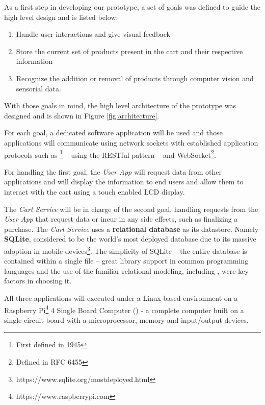 \documentclass[openright]{normas-utf-tex} %
\begin{document}
As a first step in developing our prototype, a set of
goals was defined to guide the high level design and is listed below:

\begin{enumerate}
    \item Handle user interactions and give visual feedback
    \item Store the current set of products present in the cart and their respective information
    \item Recognize the addition or removal of products through computer vision and sensorial data.
\end{enumerate}

With those goals in mind, the high level architecture of the prototype
was designed and is shown in Figure \ref{fig:architecture}.

For each goal, a dedicated software application will be used and those
applications will communicate using 
network sockets \cite{Kurose2013} with established application protocols such as
\footnote{First defined in
 1945} -- using the RESTful pattern -- and
WebSocket\footnote{Defined in RFC 6455}.

For handling the first goal, the \textit{User App} will request data
from other applications and will display the information to end users and allow
them to interact with the cart using a touch enabled LCD display.

The \textit{Cart Service} will be in charge of the second goal,
handling requests from the \textit{User App} that request data or incur in any
side effects, such as finalizing a purchase. The \textit{Cart Service} uses a
\textbf{relational database} \cite{Silberschatz2010} as its datastore. Namely
\textbf{SQLite}, considered to be the world's most deployed database due to its
massive adoption in mobile
devices\footnote{https://www.sqlite.org/mostdeployed.html}. The simplicity of
SQLite -- the entire database is contained within a single file -- great
library support in common programming languages and the use of the familiar
relational modeling, including 
\cite{Nield2016}, were key factors in choosing it.

All three applications will executed under a Linux \cite{Tanenbaum2015} 
based environment on a Raspberry Pi\footnote{https://www.raspberrypi.com} 4 Single Board
Computer () - a complete computer built on a single 
circuit board with a microprocessor, memory and input/output devices.
\end{document}
